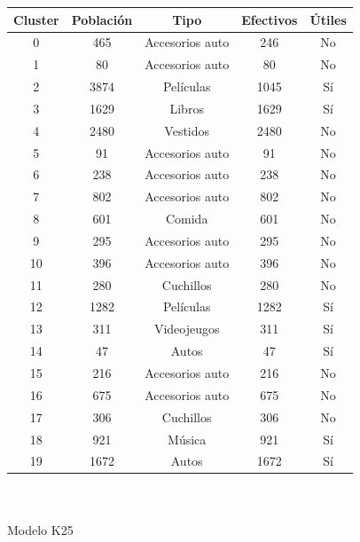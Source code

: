 \begin{tabular}{| c | c | c | c | c |}\hline
Cluster & Población & Tipo & Efectivos & Útiles\\\hline
0 & 465 & Accesorios auto & 246 & No\\
1 & 80 & Accesorios auto & 80 & No\\
2 & 3874 & Películas & 1045 & Sí\\
3 & 1629 & Libros & 1629 & Sí\\
4 & 2480 & Vestidos & 2480 & No\\
5 & 91 & Accesorios auto & 91 & No\\
6 & 238 & Accesorios auto & 238 & No\\
7 & 802 & Accesorios auto & 802 & No\\
8 & 601 & Comida & 601 & No\\
9 & 295 & Accesorios auto & 295 & No\\
10 & 396 & Accesorios auto & 396 & No\\
11 & 280 & Cuchillos & 280 & No\\
12 & 1282 & Películas & 1282 & Sí\\
13 & 311 & Videojeugos & 311 & Sí\\
14 & 47 & Autos & 47 & Sí\\
15 & 216 & Accesorios auto & 216 & No\\
16 & 675 & Accesorios auto & 675 & No\\
17 & 306 & Cuchillos & 306 & No\\
18 & 921 & Música & 921 & Sí\\
19 & 1672 & Autos & 1672 & Sí\\\hline
\end{tabular}\\
\\
Modelo K25\\
